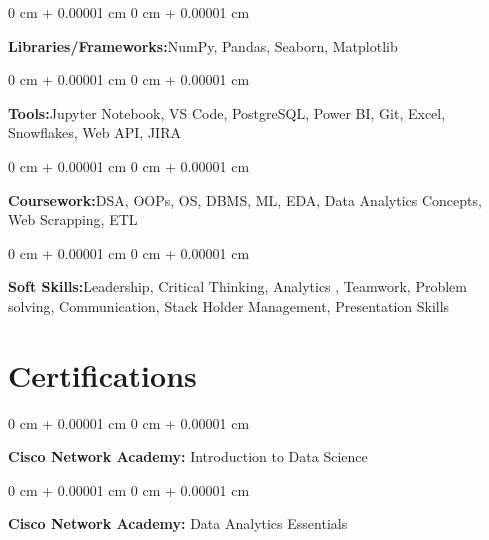 \documentclass[10pt, letterpaper]{article}
\newenvironment{onecolentry}{
    \begin{adjustwidth}{
        0 cm + 0.00001 cm
    }{
        0 cm + 0.00001 cm
    }
}{
    \end{adjustwidth}
} %
\begin{document}
        \vspace{2 pt}

        \begin{onecolentry}
            \textbf{Libraries/Frameworks:}NumPy, Pandas, Seaborn,
Matplotlib
        \end{onecolentry}

           \vspace{2 pt}

        \begin{onecolentry}
            \textbf{Tools:}Jupyter Notebook, VS Code, PostgreSQL,
Power BI, Git, Excel, Snowflakes, Web API, JIRA\end{onecolentry}

           \vspace{2 pt}

        \begin{onecolentry}
            \textbf{Coursework:}DSA, OOPs, OS, DBMS, ML, EDA, Data Analytics Concepts, Web Scrapping, ETL
        \end{onecolentry}

     \vspace{2 pt}

        \begin{onecolentry}
            \textbf{Soft Skills:}Leadership, Critical Thinking, Analytics
, Teamwork, Problem solving, Communication, Stack Holder Management, Presentation Skills
        \end{onecolentry}

\vspace{5 pt}

 \section{Certifications}



        
        \begin{onecolentry}
            \textbf{Cisco Network Academy: }Introduction to Data Science
        \end{onecolentry}

           \vspace{2 pt}

         \begin{onecolentry}
            \textbf{Cisco Network Academy: }Data Analytics Essentials
        \end{onecolentry}

\vspace{2 pt}
\end{document}
